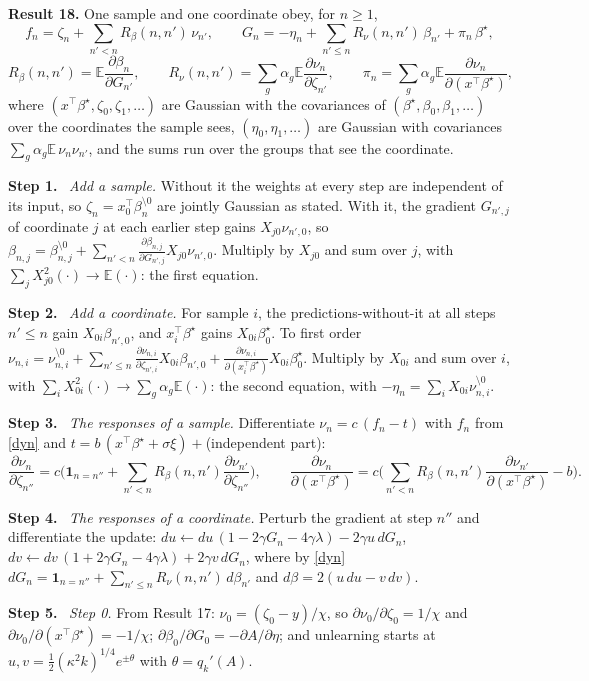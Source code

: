 \documentclass[10pt]{article}
\newcommand{\bs}{\beta^\star}\newcommand{\E}{\mathbb E}\newcommand{\asinh}{\operatorname{arcsinh}}\newcommand{\sk}{\sqrt k}
\newcommand{\step}[1]{\par\smallskip\textbf{Step #1.}\ }
\begin{document}
\textbf{Result 18.} One sample and one coordinate obey, for $n\ge1$,
\begin{equation}\label{dyn}
f_n=\zeta_n+\sum_{n'<n}R_\beta(n,n')\,\nu_{n'},\qquad G_n=-\eta_n+\sum_{n'\le n}R_\nu(n,n')\,\beta_{n'}+\pi_n\,\bs ,
\end{equation}
\[
R_\beta(n,n')=\E\frac{\partial\beta_n}{\partial G_{n'}},\qquad R_\nu(n,n')=\sum_g\alpha_g\E\frac{\partial\nu_n}{\partial\zeta_{n'}},\qquad\pi_n=\sum_g\alpha_g\E\frac{\partial\nu_n}{\partial(x^\top\bs)} ,
\]
where $(x^\top\bs,\zeta_0,\zeta_1,\dots)$ are Gaussian with the covariances of $(\bs,\beta_0,\beta_1,\dots)$ over the coordinates the sample sees, $(\eta_0,\eta_1,\dots)$ are Gaussian with covariances $\sum_g\alpha_g\E\,\nu_n\nu_{n'}$, and the sums run over the groups that see the coordinate.
\step1 \emph{Add a sample.} Without it the weights at every step are independent of its input, so $\zeta_n=x_0^\top\beta_n^{\setminus0}$ are jointly Gaussian as stated. With it, the gradient $G_{n',j}$ of coordinate $j$ at each earlier step gains $X_{j0}\nu_{n',0}$, so $\beta_{n,j}=\beta_{n,j}^{\setminus0}+\sum_{n'<n}\frac{\partial\beta_{n,j}}{\partial G_{n',j}}X_{j0}\nu_{n',0}$. Multiply by $X_{j0}$ and sum over $j$, with $\sum_jX_{j0}^2(\cdot)\to\E(\cdot)$: the first equation.
\step2 \emph{Add a coordinate.} For sample $i$, the predictions-without-it at all steps $n'\le n$ gain $X_{0i}\beta_{n',0}$, and $x_i^\top\bs$ gains $X_{0i}\bs_0$. To first order $\nu_{n,i}=\nu_{n,i}^{\setminus0}+\sum_{n'\le n}\frac{\partial\nu_{n,i}}{\partial\zeta_{n',i}}X_{0i}\beta_{n',0}+\frac{\partial\nu_{n,i}}{\partial(x_i^\top\bs)}X_{0i}\bs_0$. Multiply by $X_{0i}$ and sum over $i$, with $\sum_iX_{0i}^2(\cdot)\to\sum_g\alpha_g\E(\cdot)$: the second equation, with $-\eta_n=\sum_iX_{0i}\nu_{n,i}^{\setminus0}$.
\step3 \emph{The responses of a sample.} Differentiate $\nu_n=c\,(f_n-t)$ with $f_n$ from \eqref{dyn} and $t=b\,(x^\top\bs+\sigma\xi)+{}$(independent part):
\[
\frac{\partial\nu_n}{\partial\zeta_{n''}}=c\Big(\mathbf 1_{n=n''}+\sum_{n'<n}R_\beta(n,n')\frac{\partial\nu_{n'}}{\partial\zeta_{n''}}\Big),\qquad\frac{\partial\nu_n}{\partial(x^\top\bs)}=c\Big(\sum_{n'<n}R_\beta(n,n')\frac{\partial\nu_{n'}}{\partial(x^\top\bs)}-b\Big).
\]
\step4 \emph{The responses of a coordinate.} Perturb the gradient at step $n''$ and differentiate the update: $du\leftarrow du\,(1-2\gamma G_n-4\gamma\lambda)-2\gamma u\,dG_n$, $dv\leftarrow dv\,(1+2\gamma G_n-4\gamma\lambda)+2\gamma v\,dG_n$, where by \eqref{dyn} $dG_n=\mathbf 1_{n=n''}+\sum_{n'\le n}R_\nu(n,n')\,d\beta_{n'}$ and $d\beta=2(u\,du-v\,dv)$.
\step5 \emph{Step 0.} From Result 17: $\nu_0=(\zeta_0-y)/\chi$, so $\partial\nu_0/\partial\zeta_0=1/\chi$ and $\partial\nu_0/\partial(x^\top\bs)=-1/\chi$; $\partial\beta_0/\partial G_0=-\partial A/\partial\eta$; and unlearning starts at $u,v=\frac12(\kappa^2k)^{1/4}e^{\pm\theta}$ with $\theta=q_k'(A)$.
\end{document}
